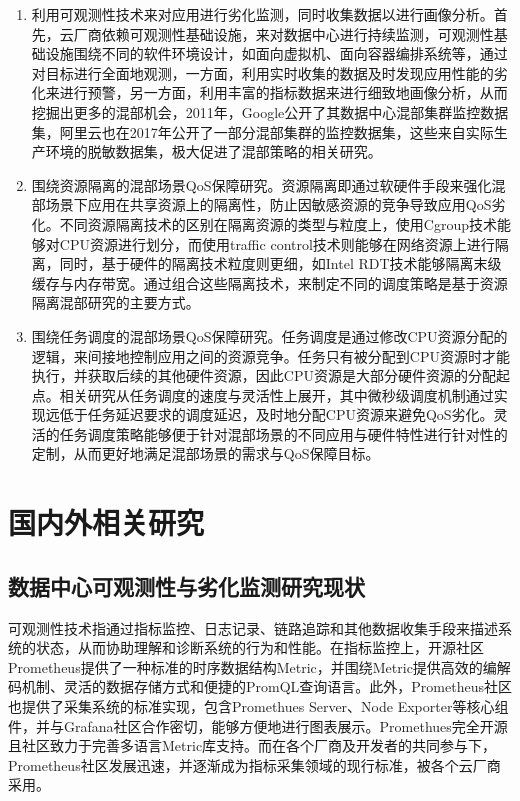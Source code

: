 \begin{enumerate}
    \item 利用可观测性技术来对应用进行劣化监测，同时收集数据以进行画像分析。首先，云厂商依赖可观测性基础设施，来对数据中心进行持续监测，可观测性基础设施围绕不同的软件环境设计，如面向虚拟机、面向容器编排系统等，通过对目标进行全面地观测，一方面，利用实时收集的数据及时发现应用性能的劣化来进行预警，另一方面，利用丰富的指标数据来进行细致地画像分析，从而挖掘出更多的混部机会，2011年，Google公开了其数据中心混部集群监控数据集，阿里云也在2017年公开了一部分混部集群的监控数据集\citep{guo2019limits}，这些来自实际生产环境的脱敏数据集，极大促进了混部策略的相关研究。
    \item 围绕资源隔离的混部场景QoS保障研究。资源隔离即通过软硬件手段来强化混部场景下应用在共享资源上的隔离性，防止因敏感资源的竞争导致应用QoS劣化。不同资源隔离技术的区别在隔离资源的类型与粒度上，使用Cgroup技术能够对CPU资源进行划分，而使用traffic control技术\citep{hubert2002linux}则能够在网络资源上进行隔离，同时，基于硬件的隔离技术粒度则更细，如Intel RDT技术\citep{guide2011intel}能够隔离末级缓存与内存带宽。通过组合这些隔离技术，来制定不同的调度策略是基于资源隔离混部研究的主要方式。
    \item 围绕任务调度的混部场景QoS保障研究。任务调度是通过修改CPU资源分配的逻辑，来间接地控制应用之间的资源竞争。任务只有被分配到CPU资源时才能执行，并获取后续的其他硬件资源，因此CPU资源是大部分硬件资源的分配起点。相关研究从任务调度的速度与灵活性上展开，其中微秒级调度机制通过实现远低于任务延迟要求的调度延迟，及时地分配CPU资源来避免QoS劣化。灵活的任务调度策略能够便于针对混部场景的不同应用与硬件特性进行针对性的定制，从而更好地满足混部场景的需求与QoS保障目标。
\end{enumerate}

\section{国内外相关研究}

\subsection{数据中心可观测性与劣化监测研究现状}


可观测性技术指通过指标监控、日志记录、链路追踪和其他数据收集手段来描述系统的状态，从而协助理解和诊断系统的行为和性能。在指标监控上，开源社区Prometheus\citep{brazil2018prometheus}提供了一种标准的时序数据结构Metric，并围绕Metric提供高效的编解码机制、灵活的数据存储方式和便捷的PromQL查询语言。此外，Prometheus社区也提供了采集系统的标准实现，包含Promethues Server、Node Exporter等核心组件，并与Grafana社区合作密切，能够方便地进行图表展示。Promethues完全开源且社区致力于完善多语言Metric库支持。而在各个厂商及开发者的共同参与下，Prometheus社区发展迅速，并逐渐成为指标采集领域的现行标准，被各个云厂商采用。

